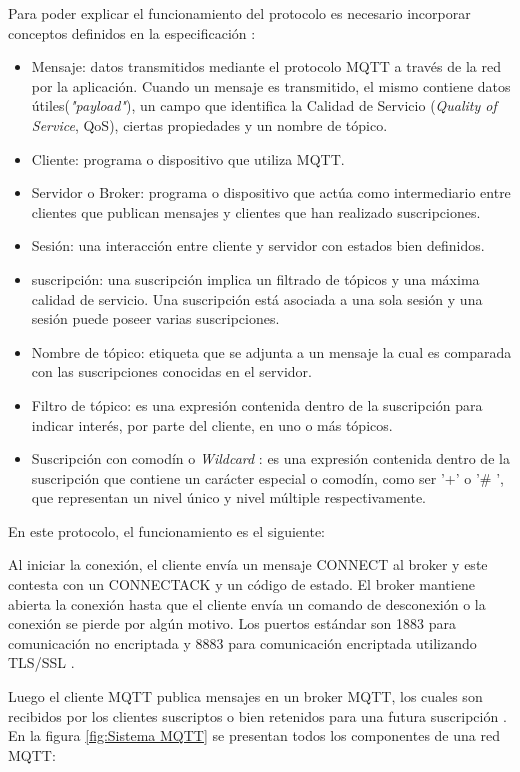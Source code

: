 Para poder explicar el funcionamiento del protocolo es necesario incorporar conceptos definidos en la especificación \citep{WEBSITE:5}:

\begin{itemize}
\item Mensaje: datos transmitidos mediante el protocolo MQTT  a través de la red por la aplicación. Cuando un mensaje es transmitido, el mismo contiene datos útiles(\textit{"payload"}), un campo que identifica la Calidad de Servicio (\textit{Quality of Service}, QoS), ciertas propiedades y un nombre de tópico.
\item Cliente: programa o dispositivo que utiliza MQTT.
\item Servidor o Broker: programa o dispositivo que actúa como intermediario entre clientes que publican mensajes y clientes que han realizado suscripciones.
\item Sesión: una interacción entre cliente y servidor con estados bien definidos.
\item suscripción: una  suscripción implica un filtrado de tópicos y una máxima calidad de servicio. Una suscripción está asociada a una sola sesión y una sesión puede poseer varias suscripciones.
\item Nombre de tópico: etiqueta que se adjunta a un mensaje la cual es comparada con las suscripciones conocidas en el servidor.
\item Filtro de tópico: es una expresión contenida dentro de la suscripción para indicar interés, por parte del cliente, en uno o más tópicos.
\item Suscripción con comodín o \textit{Wildcard} : es una expresión contenida dentro de la suscripción que contiene un carácter especial o comodín, como ser '+' o '\# ', que representan un nivel único y nivel múltiple respectivamente.

\end{itemize}

En este protocolo, el funcionamiento es el siguiente: 

Al iniciar la conexión, el cliente envía un mensaje CONNECT al broker y este contesta con un CONNECTACK y un código de estado. El broker mantiene abierta la conexión hasta que el cliente envía un comando de desconexión o la conexión se pierde por algún motivo. Los puertos estándar son 1883 para comunicación no encriptada y 8883 para comunicación encriptada utilizando TLS/SSL \citep{ARTICLE:4}.

Luego el cliente MQTT publica mensajes en un broker MQTT, los cuales son recibidos por los clientes suscriptos o bien retenidos para una futura suscripción \citep{WEBSITE:5}. En la figura \ref{fig:Sistema MQTT} se presentan todos los componentes de una red MQTT:  

